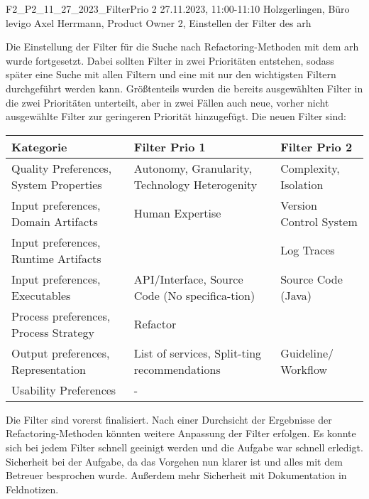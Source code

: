 \fieldnote
{F2\_P2\_11\_27\_2023\_FilterPrio}
{2}
{27.11.2023, 11:00-11:10}
{Holzgerlingen, Büro levigo}
{Axel Herrmann, Product Owner}
{2, Einstellen der Filter des \gls{arh}}
{
	Die Einstellung der Filter für die Suche nach Refactoring-Methoden mit dem \gls{arh} wurde fortgesetzt.
	Dabei sollten Filter in zwei Prioritäten entstehen, sodass später eine Suche mit allen Filtern und eine mit nur den wichtigsten Filtern durchgeführt werden kann.
	Größtenteils wurden die bereits ausgewählten Filter in die zwei Prioritäten unterteilt, aber in zwei Fällen auch neue, vorher nicht ausgewählte Filter zur geringeren Priorität hinzugefügt.
	Die neuen Filter sind:
	\begin{tabular}{|p{3cm}|p{3.5cm}|p{3cm}|}
		\hline
		\textbf{Kategorie} & \textbf{Filter Prio 1} & \textbf{Filter Prio 2} \\ \hline
		Quality Preferences, System Properties & Autonomy, Granularity, Technology Heterogenity & Complexity, Isolation \\ \hline
		Input preferences, Domain Artifacts & Human Expertise & Version Control System \\ \hline
		Input preferences, Runtime Artifacts & & Log Traces \\ \hline
		Input preferences, Executables & API/Interface, Source Code (No specifica-tion) & Source Code (Java) \\ \hline
		Process preferences, Process Strategy & Refactor & \\ \hline
		Output preferences, Representation & List of services, Split-ting recommendations & Guideline/ Workflow \\ \hline
		Usability Preferences & - & \\ \hline
	\end{tabular}
}
{
	Die Filter sind vorerst finalisiert. Nach einer Durchsicht der Ergebnisse der Refactoring-Methoden könnten weitere Anpassung der Filter erfolgen.
}
{
	Es konnte sich bei jedem Filter schnell geeinigt werden und die Aufgabe war schnell erledigt.
}
{}
{
	Sicherheit bei der Aufgabe, da das Vorgehen nun klarer ist und alles mit dem Betreuer besprochen wurde. 
	Außerdem mehr Sicherheit mit Dokumentation in Feldnotizen.
}
